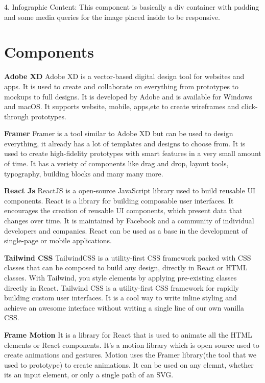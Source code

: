 4. Infographic Content: This component is basically a div container with padding and some media queries for the image placed inside to be responsive. 

\section{Components}

\textbf{Adobe XD}
Adobe XD is a vector-based digital design tool for websites and apps. It is used to  create and collaborate on everything from prototypes to mockups to full designs. It is developed by Adobe and is available for Windows and macOS. It supports website, mobile, apps,etc to create wireframes and click-through prototypes.

\textbf{Framer}
Framer is a tool similar to Adobe XD but can be used to design everything, it already has a lot of templates and designs to choose from. It is used to create high-fidelity prototypes with smart features in a very small amount of time. It has a veriety of components like drag and drop, layout tools, typography, building blocks and many many more.

\textbf{React Js}
ReactJS is a open-source JavaScript library used to build reusable UI components. React is a library for building composable user interfaces. It encourages the creation of reusable UI components, which present data that changes over time. It is maintained by Facebook and a community of individual developers and companies. React can be used as a base in the development of single-page or mobile applications.


\textbf{Tailwind CSS}
TailwindCSS is a utility-first CSS framework packed with CSS classes that can be composed to build any design, directly in React or HTML classes. With Tailwind, you style elements by applying pre-existing classes directly in React. Tailwind CSS is a utility-first CSS framework for rapidly building custom user interfaces. It is a cool way to write inline styling and achieve an awesome interface without writing a single line of our own vanilla CSS.

\textbf{ Frame Motion }
It is a library for React that is used to animate all the HTML elements or React components. It's a motion library which is open source used to create animations and gestures. Motion uses the Framer library(the tool that we used to prototype) to create animations. It can be used on any elemnt, whether its an input element, or only a single path of an SVG.

